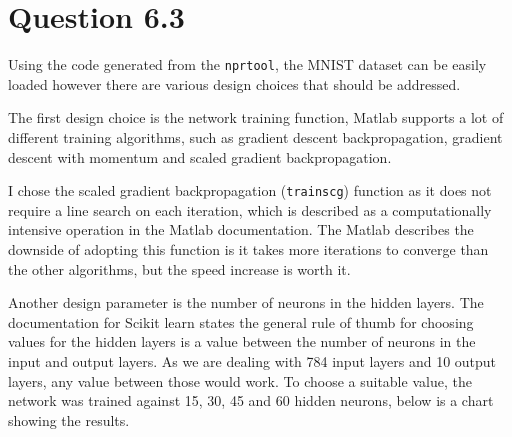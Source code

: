 \section*{Question 6.3}

Using the code generated from the \verb|nprtool|, the MNIST dataset can be easily loaded however there are various design choices that should be addressed.

The first design choice is the network training function, Matlab supports a lot of different training algorithms, such as gradient descent backpropagation, gradient descent with momentum and scaled gradient backpropagation.

I chose the scaled gradient backpropagation (\verb|trainscg|) function as it does not require a line search on each iteration,
which is described as a computationally intensive operation in the Matlab documentation.
The Matlab describes the downside of adopting this function is it takes more iterations to converge than the other algorithms,
but the speed increase is worth it.


Another design parameter is the number of neurons in the hidden layers.
The documentation for Scikit learn states the general rule of thumb for choosing values for the hidden layers is a value between the number of neurons in the input and output layers.
As we are dealing with 784 input layers and 10 output layers, any value between those would work.
To choose a suitable value, the network was trained against 15, 30, 45 and 60 hidden neurons, below is a chart showing the results.

